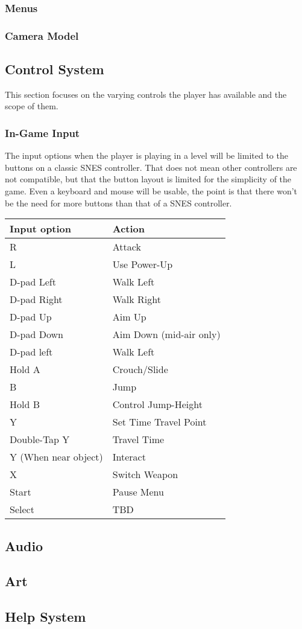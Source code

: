 \documentclass[12pt]{article}
\begin{document}
\subsubsection{Menus}

\subsubsection{Camera Model}

\subsection{Control System}

This section focuses on the varying controls the player has available and the scope of them. 

\subsubsection{In-Game Input}

The input options when the player is playing in a level will be limited to the buttons on a classic SNES controller. That does not mean other controllers are not compatible, but that the button layout is limited for the simplicity of the game. Even a keyboard and mouse will be usable, the point is that there won't be the need for more buttons than that of a SNES controller. 

\begin{center}
\begin{tabular}{ | l | l | }
 \hline
 \textbf{Input option} & \textbf{Action} \\
 \hline
 R & Attack \\  
 \hline 
 L & Use Power-Up \\
 \hline
 D-pad Left & Walk Left \\
 \hline
 D-pad Right & Walk Right \\
 \hline
 D-pad Up & Aim Up \\
 \hline
 D-pad Down & Aim Down (mid-air only) \\
 \hline
 D-pad left & Walk Left \\
 \hline
 Hold A & Crouch/Slide \\
 \hline
 B & Jump \\
 \hline
 Hold B & Control Jump-Height\\
 \hline
 Y & Set Time Travel Point \\
 \hline
 Double-Tap Y & Travel Time \\
 \hline
  Y (When near object) & Interact \\
 \hline
 X & Switch Weapon \\
 \hline
 Start & Pause Menu \\
 \hline
 Select & TBD \\
 \hline
\end{tabular}
\end{center}

\subsection{Audio}

\subsection{Art}

\subsection{Help System}
\end{document}
